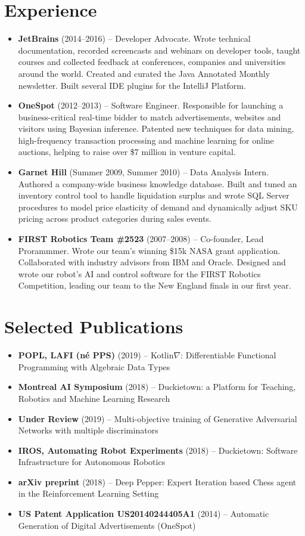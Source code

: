 \documentclass[letterpaper,11pt]{article}
\newcommand{\resumeItem}[2]{
\item\small{
\textbf{#1}{ #2 \vspace{-2pt}}
}
}
\newcommand{\resumeSubItem}[2]{\resumeItem{#1}{#2}\vspace{-4pt}}
\newcommand{\resumeSubHeadingListStart}{\begin{itemize}[leftmargin=*]}
\newcommand{\resumeSubHeadingListEnd}{\end{itemize}}
\begin{document}
\begin{justify}
\section{Experience}
\resumeSubHeadingListStart
\resumeSubItem{JetBrains}{(2014--2016) -- Developer Advocate. Wrote technical documentation, recorded screencasts and webinars on developer tools, taught courses and collected feedback at conferences, companies and universities around the world. Created and curated the Java Annotated Monthly newsletter. Built several IDE plugins for the IntelliJ Platform.}
\resumeSubItem{OneSpot}{(2012--2013) -- Software Engineer. Responsible for launching a business-critical real-time bidder to match advertisements, websites and visitors using Bayesian inference. Patented new techniques for data mining, high-frequency transaction processing and machine learning for online auctions, helping to raise over \$7 million in venture capital.}
\resumeSubItem{Garnet Hill}{(Summer 2009, Summer 2010) -- Data Analysis Intern. Authored a company-wide business knowledge database. Built and tuned an inventory control tool to handle liquidation surplus and wrote SQL Server procedures to model price elasticity of demand and dynamically adjust SKU pricing across product categories during sales events.}
\resumeSubItem{FIRST Robotics Team \#2523}{(2007--2008) -- Co-founder, Lead Prorammmer. Wrote our team's winning \$15k NASA grant application. Collaborated with industry advisors from IBM and Oracle. Designed and wrote our robot's AI and control software for the FIRST Robotics Competition, leading our team to the New England finals in our first year.}
\resumeSubHeadingListEnd


\section{Selected Publications}
\resumeSubHeadingListStart
\resumeSubItem{POPL, LAFI (n\'e PPS)} {(2019) -- Kotlin$\nabla$: Differentiable Functional Programming with Algebraic Data Types}
\resumeSubItem{Montreal AI Symposium} {(2018) -- Duckietown: a Platform for Teaching, Robotics and Machine Learning Research}
\resumeSubItem{Under Review} {(2019) -- Multi-objective training of Generative Adversarial Networks with multiple discriminators}
\resumeSubItem{IROS, Automating Robot Experiments} {(2018) -- Duckietown: Software Infrastructure for Autonomous Robotics}
\resumeSubItem{arXiv preprint} {(2018) -- Deep Pepper: Expert Iteration based Chess agent in the Reinforcement Learning Setting}
\resumeSubItem{US Patent Application US20140244405A1} {(2014) -- Automatic Generation of Digital Advertisements (OneSpot)}
\resumeSubHeadingListEnd


\end{justify}
\end{document}
